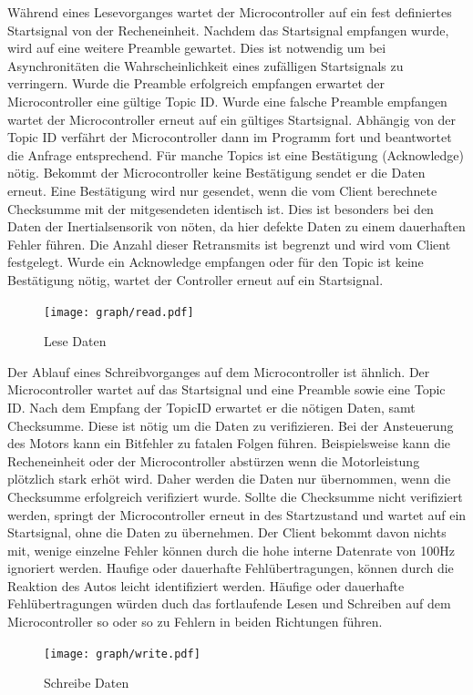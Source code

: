 
Während eines Lesevorganges wartet der Microcontroller auf ein fest definiertes Startsignal von der Recheneinheit. Nachdem das Startsignal empfangen wurde, wird auf eine weitere Preamble gewartet.
Dies ist notwendig um bei Asynchronitäten die Wahrscheinlichkeit eines zufälligen Startsignals zu verringern. Wurde die Preamble erfolgreich empfangen erwartet der Microcontroller eine gültige Topic ID.
Wurde eine falsche Preamble empfangen wartet der Microcontroller erneut auf ein gültiges Startsignal. Abhängig von der Topic ID verfährt der Microcontroller dann im Programm fort und beantwortet
die Anfrage entsprechend. Für manche Topics ist eine Bestätigung (Acknowledge) nötig. Bekommt der Microcontroller keine Bestätigung sendet er die Daten erneut. Eine Bestätigung wird nur gesendet,
wenn die vom Client berechnete Checksumme mit der mitgesendeten identisch ist. Dies ist besonders bei den Daten der Inertialsensorik von nöten, da hier defekte Daten zu einem dauerhaften Fehler führen. 
Die Anzahl dieser Retransmits ist begrenzt und wird vom Client festgelegt. Wurde ein Acknowledge empfangen oder für den Topic ist keine Bestätigung
nötig, wartet der Controller erneut auf ein Startsignal.

\begin{figure}[ht]
\centering
\texttt{[image: graph/read.pdf]} 
\caption{Lese Daten}
\label{fig:uC_read}
\end{figure}

Der Ablauf eines Schreibvorganges auf dem Microcontroller ist ähnlich. Der Microcontroller wartet auf das Startsignal und eine Preamble sowie eine Topic ID.
Nach dem Empfang der TopicID erwartet er die nötigen Daten, samt Checksumme. Diese ist nötig um die Daten zu verifizieren. Bei der Ansteuerung des Motors kann ein
Bitfehler zu fatalen Folgen führen. Beispielsweise kann die Recheneinheit oder der Microcontroller abstürzen wenn die Motorleistung plötzlich stark erhöt wird.
Daher werden die Daten nur übernommen, wenn die Checksumme erfolgreich verifiziert wurde. Sollte die Checksumme nicht verifiziert werden, springt der Microcontroller
erneut in des Startzustand und wartet auf ein Startsignal, ohne die Daten zu übernehmen. Der Client bekommt davon nichts mit, wenige einzelne Fehler können durch die
hohe interne Datenrate von 100Hz ignoriert werden. Haufige oder dauerhafte Fehlübertragungen, können durch die Reaktion des Autos leicht identifiziert werden.
Häufige oder dauerhafte Fehlübertragungen würden duch das fortlaufende Lesen und Schreiben auf dem Microcontroller so oder so zu Fehlern in beiden Richtungen führen.

\begin{figure}[ht]
\centering
\texttt{[image: graph/write.pdf]} 
\caption{Schreibe Daten}
\label{fig:uC_write}
\end{figure}





